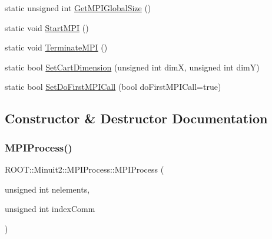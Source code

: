 \begin{DoxyCompactItemize}
\item 
static unsigned int \mbox{\hyperlink{classROOT_1_1Minuit2_1_1MPIProcess_acfa3106122ad8f8c7d6bb3777c3d1ccc}{Get\+M\+P\+I\+Global\+Size}} ()
\item 
static void \mbox{\hyperlink{classROOT_1_1Minuit2_1_1MPIProcess_a235146d3dbd688de458e09425e546d96}{Start\+M\+PI}} ()
\item 
static void \mbox{\hyperlink{classROOT_1_1Minuit2_1_1MPIProcess_aa870a057a256be2d95fb7e9d03a9c298}{Terminate\+M\+PI}} ()
\item 
static bool \mbox{\hyperlink{classROOT_1_1Minuit2_1_1MPIProcess_a225f9dc66bcc0098c9f9ac0ec7c498b1}{Set\+Cart\+Dimension}} (unsigned int dimX, unsigned int dimY)
\item 
static bool \mbox{\hyperlink{classROOT_1_1Minuit2_1_1MPIProcess_ae4e6932bbb197c4bff1a17ed3a8b0670}{Set\+Do\+First\+M\+P\+I\+Call}} (bool do\+First\+M\+P\+I\+Call=true)
\end{DoxyCompactItemize}


\subsection{Constructor \& Destructor Documentation}
\mbox{\label{classROOT_1_1Minuit2_1_1MPIProcess_a43d72185b19c2e99f914ff408fd2755b}} 
\subsubsection{\texorpdfstring{MPIProcess()}{MPIProcess()}\hspace{0.1cm}{\footnotesize\ttfamily [1/3]}}
{\footnotesize\ttfamily R\+O\+O\+T\+::\+Minuit2\+::\+M\+P\+I\+Process\+::\+M\+P\+I\+Process (\begin{DoxyParamCaption}\item[{unsigned int}]{nelements,  }\item[{unsigned int}]{index\+Comm }\end{DoxyParamCaption})}


